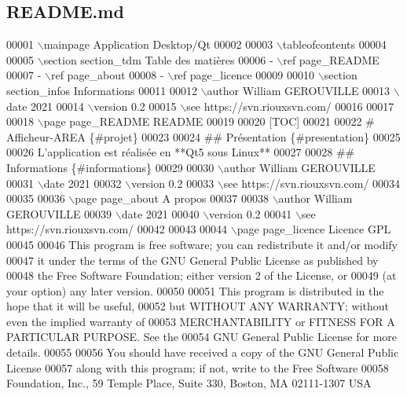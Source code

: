 \hypertarget{_r_e_a_d_m_e_8md_source}{}\subsection{R\+E\+A\+D\+M\+E.\+md}

\begin{DoxyCode}
00001 \(\backslash\)mainpage Application Desktop/Qt
00002 
00003 \(\backslash\)tableofcontents
00004 
00005 \(\backslash\)section section\_tdm Table des matières
00006 - \(\backslash\)ref page\_README
00007 - \(\backslash\)ref page\_about
00008 - \(\backslash\)ref page\_licence
00009 
00010 \(\backslash\)section section\_infos Informations
00011 
00012 \(\backslash\)author William GEROUVILLE
00013 \(\backslash\)date 2021
00014 \(\backslash\)version 0.2
00015 \(\backslash\)see https://svn.riouxsvn.com/
00016 
00017 
00018 \(\backslash\)page page\_README README
00019 
00020 [TOC]
00021 
00022 # Afficheur-AREA \{#projet\}
00023 
00024 ## Présentation \{#presentation\}
00025 
00026 L’application est réalisée en **Qt5 sous Linux**
00027 
00028 ## Informations \{#informations\}
00029 
00030 \(\backslash\)author William GEROUVILLE
00031 \(\backslash\)date 2021
00032 \(\backslash\)version 0.2
00033 \(\backslash\)see https://svn.riouxsvn.com/
00034 
00035 
00036 \(\backslash\)page page\_about A propos
00037 
00038 \(\backslash\)author William GEROUVILLE
00039 \(\backslash\)date 2021
00040 \(\backslash\)version 0.2
00041 \(\backslash\)see https://svn.riouxsvn.com/
00042 
00043 
00044 \(\backslash\)page page\_licence Licence GPL
00045 
00046 This program is free software; you can redistribute it and/or modify
00047 it under the terms of the GNU General Public License as published by
00048 the Free Software Foundation; either version 2 of the License, or
00049 (at your option) any later version.
00050 
00051 This program is distributed in the hope that it will be useful,
00052 but WITHOUT ANY WARRANTY; without even the implied warranty of
00053 MERCHANTABILITY or FITNESS FOR A PARTICULAR PURPOSE. See the
00054 GNU General Public License for more details.
00055 
00056 You should have received a copy of the GNU General Public License
00057 along with this program; if not, write to the Free Software
00058 Foundation, Inc., 59 Temple Place, Suite 330, Boston, MA 02111-1307 USA
\end{DoxyCode}
